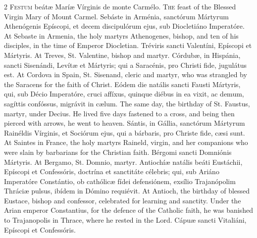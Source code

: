 \begin{paracol}{2}
\lettrine[lines=2]{F}{estum} beátæ Maríæ 
 Vírginis de monte Carmélo.
\switchcolumn
{}
\lettrine[lines=2]{T}{he} feast of the Blessed Virgin Mary 
 of Mount Carmel.
\switchcolumn*
{}
Sebáste in Arménia, sanctórum Mártyrum Athenógenis Epíscopi, et decem discipulórum ejus, sub 
 Diocletiáno Imperatóre.
\switchcolumn
{}
At Sebaste in Armenia, the holy 
 martyrs Athenogenes, bishop, and ten of his disciples, in the time of 
 Emperor Diocletian.
\switchcolumn*
{}
Tréviris sancti 
 Valentíni, Epíscopi et Mártyris.
\switchcolumn
{}
At Treves, St. Valentine, bishop and 
 martyr.
\switchcolumn*
{}
Córdubæ, in Hispánia, 
 sancti Sisenándi, Levítæ et Mártyris; qui a Saracénis, pro Christi fide, 
 jugulátus est.
\switchcolumn
{}
At Cordova in Spain, St. Sisenand, 
 cleric and martyr, who was strangled by the Saracens for the faith of 
 Christ.
\switchcolumn*
{}
Eódem die natális 
 sancti Fausti Mártyris, qui, sub Décio Imperatóre, cruci affíxus, quinque 
 diébus in ea vixit, ac demum, sagíttis confóssus, migrávit in cælum.
\switchcolumn
{}
The same day, the birthday of St. 
 Faustus, martyr, under Decius. He lived five days fastened to a cross, 
 and being then pierced with arrows, he went to heaven.
\switchcolumn*
{}
Sántis, in Gállia, 
 sanctórum Mártyrum Rainéldis Vírginis, et Sociórum ejus, qui a bárbaris, pro 
 Christe fide, cæsi sunt.
\switchcolumn
{}
At Saintes in France, the holy 
 martyrs Raineld, virgin, and her companions who were slain by barbarians for 
 the Christian faith.
\switchcolumn*
{}
Bérgomi sancti 
 Domniónis Mártyris.
\switchcolumn
{}
At Bergamo, St. Domnio, martyr.
\switchcolumn*
{}
Antiochíæ natális beáti 
 Eustáchii, Epíscopi et Confessóris, doctrína et sanctitáte célebris; qui, 
 sub Ariáno Imperatóre Constántio, ob cathólicæ fídei defensiónem, exsílio 
 Trajanópolim Thráciæ pulsus, ibídem in Dómino requiévit.
\switchcolumn
{}
At Antioch, the birthday of blessed 
 Eustace, bishop and confessor, celebrated for learning and sanctity. 
 Under the Arian emperor Constantius, for the defence of the Catholic faith, 
 he was banished to Trajanopolis in Thrace, where he rested in the Lord.
\switchcolumn*
{}
Cápuæ sancti Vitaliáni, 
 Epíscopi et Confessóris.

\end{paracol}
